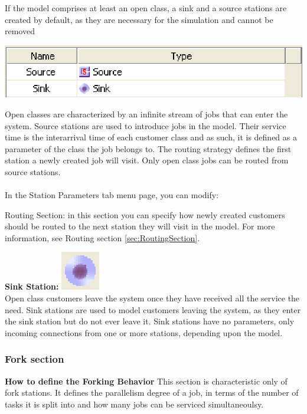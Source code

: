 \begin{enumerate*}
If the model comprises at least an open class, a sink and  a source stations are created by default, as they are necessary for the simulation and cannot be removed\\
\begin{center}
\includegraphics[scale=.5]{img/jsim/source_sink.eps}
\end{center}
Open classes are characterized by an infinite stream of jobs that can enter the system. Source stations are used to introduce jobs in the model. Their service time is the interarrival time of each customer class and as such, it is defined as a parameter of the class the job belongs to. The routing strategy defines the first station
a newly created job will visit. Only open class jobs can be routed from source stations.\\\\
In the Station Parameters tab menu page, you can modify:
\begin{description*}
\item[Routing Section:] in this section you can specify how newly created customers should be routed to the next station they will visit in the model.
For more information, see Routing section \autoref{sec:RoutingSection}.
\end{description*}
\item \textbf{Sink Station:} \includegraphics[scale=1]{img/jsim/sink.eps}\\
Open class customers leave the system once they have received all the service the need. Sink stations are used to model customers leaving the system, as they
enter the sink station but do not ever leave it. Sink stations have no parameters, only incoming connections from one or more stations, depending upon the model.
\end{enumerate*}

\subsubsection{Fork section}
\label{sec:ForkSection}
\textbf{How to define the Forking Behavior}
This section is characteristic only of fork stations. It defines the parallelism degree of a job, in terms of the number of tasks it is split into and how many jobs can be serviced simultaneoulsy.

